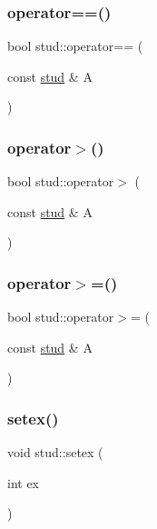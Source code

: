 \mbox{\label{structstud_af75e6539277cd957250c0f787e1d836a}} 
\subsubsection{\texorpdfstring{operator==()}{operator==()}}
{\footnotesize\ttfamily bool stud\+::operator== (\begin{DoxyParamCaption}\item[{const \mbox{\hyperlink{structstud}{stud}} \&}]{A }\end{DoxyParamCaption})}

\mbox{\label{structstud_a81475ac8b96fabd20119059f86be5b91}} 
\subsubsection{\texorpdfstring{operator$>$()}{operator>()}}
{\footnotesize\ttfamily bool stud\+::operator$>$ (\begin{DoxyParamCaption}\item[{const \mbox{\hyperlink{structstud}{stud}} \&}]{A }\end{DoxyParamCaption})}

\mbox{\label{structstud_a9429e8c92f864d5f6a70d907b35f0254}} 
\subsubsection{\texorpdfstring{operator$>$=()}{operator>=()}}
{\footnotesize\ttfamily bool stud\+::operator$>$= (\begin{DoxyParamCaption}\item[{const \mbox{\hyperlink{structstud}{stud}} \&}]{A }\end{DoxyParamCaption})}

\mbox{\label{structstud_af1a38e3c3ec728a5f05f60160ea1da58}} 
\subsubsection{\texorpdfstring{setex()}{setex()}\hspace{0.1cm}{\footnotesize\ttfamily [1/2]}}
{\footnotesize\ttfamily void stud\+::setex (\begin{DoxyParamCaption}\item[{int}]{ex }\end{DoxyParamCaption})\hspace{0.3cm}{\ttfamily [inline]}}


